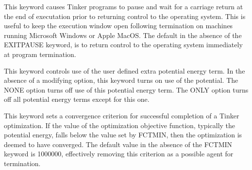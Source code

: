 \documentclass[letterpaper,11pt,english]{sphinxmanual}
\begin{document}
  This keyword causes Tinker programs to pause and wait for a carriage return at the end of executation prior to returning control to the operating system. This is useful to keep the execution window open following termination on machines running Microsoft Windows or Apple MacOS. The default in the absence of the EXIT\sphinxhyphen{}PAUSE keyword, is to return control to the operating system immediately at program termination.

  This keyword controls use of the user defined extra potential energy term. In the absence of a modifying option, this keyword turns on use of the potential. The NONE option turns off use of this potential energy term. The ONLY option turns off all potential energy terms except for this one.

  This keyword sets a convergence criterion for successful completion of a Tinker optimization. If the value of the optimization objective function, typically the potential energy, falls below the value set by FCTMIN, then the optimization is deemed to have converged. The default value in the absence of the FCTMIN keyword is \sphinxhyphen{}1000000, effectively removing this criterion as a possible agent for termination.















\end{document}
